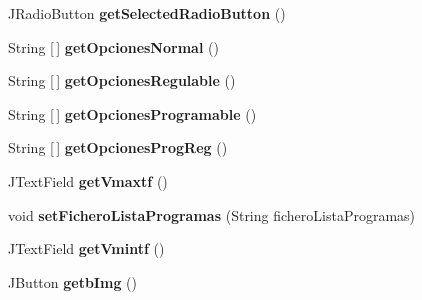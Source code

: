 \begin{DoxyCompactItemize}
J\+Radio\+Button {\bfseries get\+Selected\+Radio\+Button} ()
\item 
\mbox{\label{classvista_1_1_dialogo_a_xC3_xB1adir_editar_e_d_aa7d9b9ec930df09cb84dd3336f121688}} 
String \mbox{[}$\,$\mbox{]} {\bfseries get\+Opciones\+Normal} ()
\item 
\mbox{\label{classvista_1_1_dialogo_a_xC3_xB1adir_editar_e_d_acbbbc6b7ab5d077466db0fd993c9364d}} 
String \mbox{[}$\,$\mbox{]} {\bfseries get\+Opciones\+Regulable} ()
\item 
\mbox{\label{classvista_1_1_dialogo_a_xC3_xB1adir_editar_e_d_a454167bccc99ac3a89b5a2a4104d25ab}} 
String \mbox{[}$\,$\mbox{]} {\bfseries get\+Opciones\+Programable} ()
\item 
\mbox{\label{classvista_1_1_dialogo_a_xC3_xB1adir_editar_e_d_a2773d9feaddd2fceefd790236c5fef53}} 
String \mbox{[}$\,$\mbox{]} {\bfseries get\+Opciones\+Prog\+Reg} ()
\item 
\mbox{\label{classvista_1_1_dialogo_a_xC3_xB1adir_editar_e_d_ab09d8c7bdcd4ec1669ea75748fdaccc1}} 
J\+Text\+Field {\bfseries get\+Vmaxtf} ()
\item 
\mbox{\label{classvista_1_1_dialogo_a_xC3_xB1adir_editar_e_d_a95a4db4b81684e42edc4cb68906d56a3}} 
void {\bfseries set\+Fichero\+Lista\+Programas} (String fichero\+Lista\+Programas)
\item 
\mbox{\label{classvista_1_1_dialogo_a_xC3_xB1adir_editar_e_d_a4ee7c1d76677e9870ea40819f7354684}} 
J\+Text\+Field {\bfseries get\+Vmintf} ()
\item 
\mbox{\label{classvista_1_1_dialogo_a_xC3_xB1adir_editar_e_d_a17ccb4ab4bde3e3709b92e1528a068bf}} 
J\+Button {\bfseries getb\+Img} ()
\item 
\mbox{\label{classvista_1_1_dialogo_a_xC3_xB1adir_editar_e_d_a88611d926b8c42d19ab1644570190a08}} 

\end{DoxyCompactItemize}

